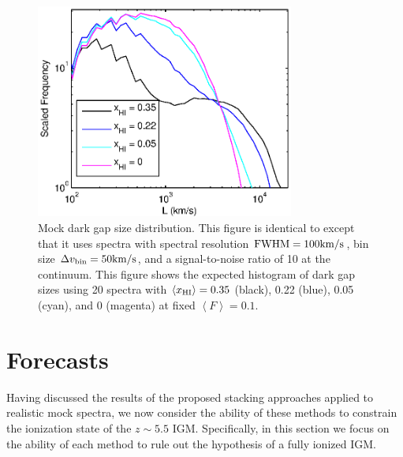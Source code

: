\begin{figure}[h]
  \centering
  \includegraphics[width=8.5cm]{fig11.eps}
  \caption{Mock dark gap size distribution. This figure is identical to  except that it uses spectra with spectral resolution $\text{FWHM} = 100\text{km}/\text{s}$, bin size $\Delta v_{\text{bin}} = 50\text{km}/\text{s}$, and a signal-to-noise ratio of 10 at the continuum. This figure shows the expected histogram of dark gap sizes using 20 spectra with $\langle x_{\text{HI}}\rangle = 0.35$ (black), 0.22 (blue), 0.05 (cyan), and 0 (magenta) at fixed $\left\langle F \right\rangle = 0.1$.}
  \label{fig:DarkGapsResults}
\end{figure}



\section{Forecasts} \label{sec:Forecasts}


Having discussed the results of the proposed stacking approaches applied to realistic mock spectra, we now consider the ability of these methods to constrain the ionization state of the $z \sim 5.5$ IGM. Specifically, in this section we focus on the ability of each method to rule out the hypothesis of a fully ionized IGM. 


